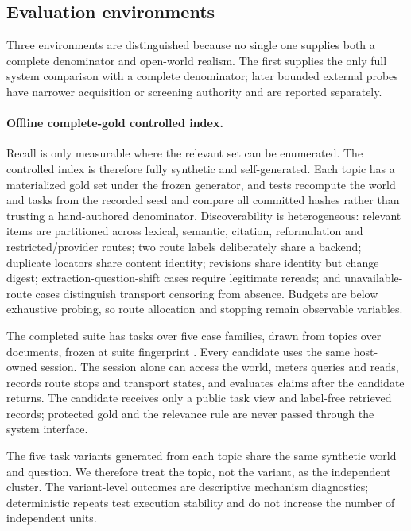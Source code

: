 \subsection{Evaluation environments}
Three environments are distinguished because no single one supplies both a
complete denominator and open-world realism.  The first supplies the only full
system comparison with a complete denominator; later bounded external probes
have narrower acquisition or screening authority and are reported separately.

\paragraph{Offline complete-gold controlled index.}
Recall is only measurable where the relevant set can be enumerated.  The
controlled index is therefore fully synthetic and self-generated.  Each topic
has a materialized gold set under the frozen generator, and tests recompute the
world and tasks from the recorded seed and compare all committed hashes rather
than trusting a hand-authored denominator.  Discoverability is heterogeneous:
relevant items are partitioned across lexical, semantic, citation,
reformulation and restricted/provider routes; two route labels deliberately
share a backend; duplicate locators share content identity; revisions share
identity but change digest; extraction-question-shift cases require legitimate
rereads; and unavailable-route cases distinguish transport censoring from
absence.  Budgets are below exhaustive probing, so route allocation and stopping
remain observable variables.

The completed suite has \OfflineTaskCount{} tasks over five case families, drawn from \OfflineTopicCount{} topics over \OfflineDocumentCount{} documents, frozen at suite fingerprint \texttt{\OfflineSuiteFingerprintShort}.  Every candidate uses
the same host-owned session.  The session alone can access the world, meters
queries and reads, records route stops and transport states, and evaluates claims
after the candidate returns.  The candidate receives only a public task view and
label-free retrieved records; protected gold and the relevance rule are never
passed through the system interface.

The five task variants generated from each topic share the same synthetic world
and question. We therefore treat the topic, not the variant, as the independent
cluster. The \OfflineTaskCount{} variant-level outcomes are descriptive mechanism
diagnostics; deterministic repeats test execution stability and do not increase
the number of independent units.


